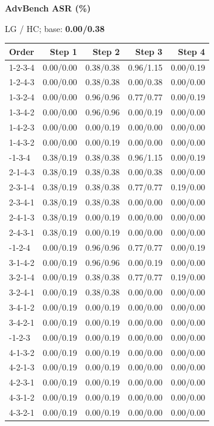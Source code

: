 \hfill
\begin{minipage}[t]{0.325\linewidth}
\centering
{\bfseries AdvBench ASR (\%)}\par
{\small LG / HC; base: \textbf{0.00/0.38}}\par\vspace{5pt}
\small\setlength{\tabcolsep}{3.5pt}\renewcommand{\arraystretch}{1.19}
\begin{tabular}{@{}lrrrr@{}}
\toprule Order & Step 1 & Step 2 & Step 3 & Step 4 \\
\midrule
1-2-3-4 & 0.00/0.00 & 0.38/0.38 & 0.96/1.15 & 0.00/0.19 \\
1-2-4-3 & 0.00/0.00 & 0.38/0.38 & 0.00/0.38 & 0.00/0.00 \\
1-3-2-4 & 0.00/0.00 & 0.96/0.96 & 0.77/0.77 & 0.00/0.19 \\
1-3-4-2 & 0.00/0.00 & 0.96/0.96 & 0.00/0.19 & 0.00/0.00 \\
1-4-2-3 & 0.00/0.00 & 0.00/0.19 & 0.00/0.00 & 0.00/0.00 \\
1-4-3-2 & 0.00/0.00 & 0.00/0.19 & 0.00/0.00 & 0.00/0.00 \\
\addlinespace[3pt]
2-1-3-4 & 0.38/0.19 & 0.38/0.38 & 0.96/1.15 & 0.00/0.19 \\
2-1-4-3 & 0.38/0.19 & 0.38/0.38 & 0.00/0.38 & 0.00/0.00 \\
2-3-1-4 & 0.38/0.19 & 0.38/0.38 & 0.77/0.77 & 0.19/0.00 \\
2-3-4-1 & 0.38/0.19 & 0.38/0.38 & 0.00/0.00 & 0.00/0.00 \\
2-4-1-3 & 0.38/0.19 & 0.00/0.19 & 0.00/0.00 & 0.00/0.00 \\
2-4-3-1 & 0.38/0.19 & 0.00/0.19 & 0.00/0.00 & 0.00/0.00 \\
\addlinespace[3pt]
3-1-2-4 & 0.00/0.19 & 0.96/0.96 & 0.77/0.77 & 0.00/0.19 \\
3-1-4-2 & 0.00/0.19 & 0.96/0.96 & 0.00/0.19 & 0.00/0.00 \\
3-2-1-4 & 0.00/0.19 & 0.38/0.38 & 0.77/0.77 & 0.19/0.00 \\
3-2-4-1 & 0.00/0.19 & 0.38/0.38 & 0.00/0.00 & 0.00/0.00 \\
3-4-1-2 & 0.00/0.19 & 0.00/0.19 & 0.00/0.00 & 0.00/0.00 \\
3-4-2-1 & 0.00/0.19 & 0.00/0.19 & 0.00/0.00 & 0.00/0.00 \\
\addlinespace[3pt]
4-1-2-3 & 0.00/0.19 & 0.00/0.19 & 0.00/0.00 & 0.00/0.00 \\
4-1-3-2 & 0.00/0.19 & 0.00/0.19 & 0.00/0.00 & 0.00/0.00 \\
4-2-1-3 & 0.00/0.19 & 0.00/0.19 & 0.00/0.00 & 0.00/0.00 \\
4-2-3-1 & 0.00/0.19 & 0.00/0.19 & 0.00/0.00 & 0.00/0.00 \\
4-3-1-2 & 0.00/0.19 & 0.00/0.19 & 0.00/0.00 & 0.00/0.00 \\
4-3-2-1 & 0.00/0.19 & 0.00/0.19 & 0.00/0.00 & 0.00/0.00 \\
\bottomrule
\end{tabular}
\end{minipage}
